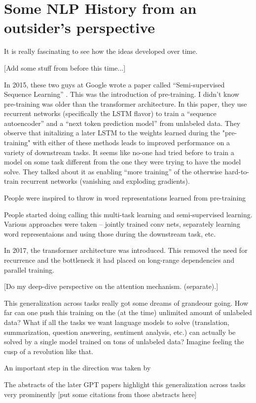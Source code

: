 \documentclass[11pt]{article}
\begin{document}
\vspace{2em}

\section*{Some NLP History from an outsider's perspective}

It is really fascinating to see how the ideas developed over time. 

[Add some stuff from before this time...]

In 2015, these two guys at Google wrote a paper called ``Semi-supervised Sequence Learning'' \citep{dai2015semi}. This was the introduction of pre-training. I didn't know pre-training was older than the transformer architecture. In this paper, they use recurrent networks (specifically the LSTM flavor) to train a ``sequence autoencoder'' and a ``next token prediction model'' from unlabeled data. They observe that initalizing a later LSTM to the weights learned during the "pre-training" with either of these methods leads to improved performance on a variety of downstream tasks. It seems like no-one had tried before to train a model on some task different from the one they were trying to have the model solve. They talked about it as enabling ``more training'' of the otherwise hard-to-train recurrent networks (vanishing and exploding gradients). 

People were inspired to throw in word representations learned from pre-training 

People started doing calling this multi-task learning and semi-supervised learning. Various approaches were taken -- jointly trained conv nets, separately learning word representaions and using those during the downstream task, etc.

In 2017, the transformer architecture was introduced. This removed the need for recurrence and the bottleneck it had placed on long-range dependencies and parallel training. 

[Do my deep-dive perspective on the attention mechanism. (separate).]

This generalization across tasks really got some dreams of grandeour going. How far can one push this training on the (at the time) unlimited amount of unlabeled data? What if all the tasks we want language models to solve (translation, summarization, question answering, sentiment analysis, etc.) can actually be solved by a single model trained on tons of unlabeled data? Imagine feeling the cusp of a revolution like that.

An important step in the direction was taken by 

The abstracts of the later GPT papers highlight this generalization across tasks very prominently [put some citations from those abstracts here]



\end{document}
